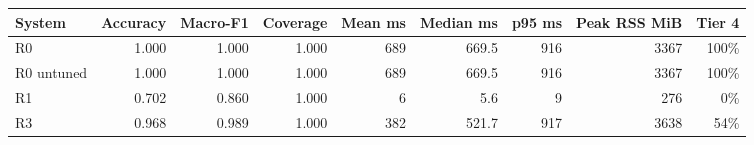 \begin{tabular}{lrrrrrrrr}
\toprule
System & Accuracy & Macro-F1 & Coverage & Mean ms & Median ms & p95 ms & Peak RSS MiB & Tier 4 \\
\midrule
R0 & 1.000 & 1.000 & 1.000 & 689 & 669.5 & 916 & 3367 & 100\% \\
R0 untuned & 1.000 & 1.000 & 1.000 & 689 & 669.5 & 916 & 3367 & 100\% \\
R1 & 0.702 & 0.860 & 1.000 & 6 & 5.6 & 9 & 276 & 0\% \\
R3 & 0.968 & 0.989 & 1.000 & 382 & 521.7 & 917 & 3638 & 54\% \\
\bottomrule
\end{tabular}
